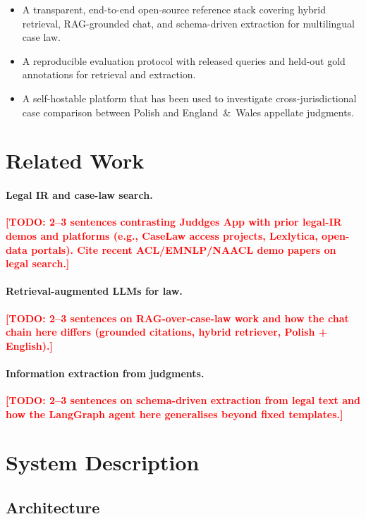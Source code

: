 \documentclass[11pt]{article}
\newcommand{\todo}[1]{\textcolor{red}{\textbf{[TODO: #1]}}}
\begin{document}
\begin{itemize}
  \item A transparent, end-to-end open-source reference stack covering
    hybrid retrieval, RAG-grounded chat, and schema-driven extraction
    for multilingual case law.
  \item A reproducible evaluation protocol with released queries and
    held-out gold annotations for retrieval and extraction.
  \item A self-hostable platform that has been used to investigate
    cross-jurisdictional case comparison between Polish and
    England~\&~Wales appellate judgments.
\end{itemize}

\section{Related Work}
\label{sec:related}

\paragraph{Legal IR and case-law search.}
\todo{2--3 sentences contrasting Juddges App with prior legal-IR
demos and platforms (e.g., CaseLaw access projects, Lexlytica,
open-data portals). Cite recent ACL/EMNLP/NAACL demo papers on legal
search.}

\paragraph{Retrieval-augmented LLMs for law.}
\todo{2--3 sentences on RAG-over-case-law work and how the chat chain
here differs (grounded citations, hybrid retriever, Polish + English).}

\paragraph{Information extraction from judgments.}
\todo{2--3 sentences on schema-driven extraction from legal text and
how the LangGraph agent here generalises beyond fixed templates.}

\section{System Description}
\label{sec:system}

\subsection{Architecture}
\label{sec:architecture}
\end{document}
